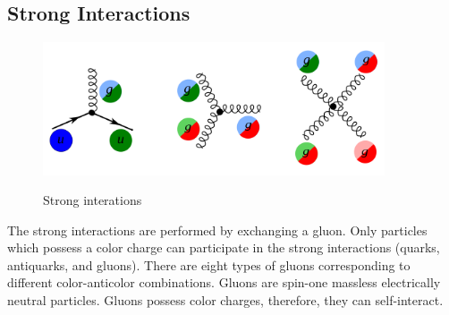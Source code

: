 \subsection{Strong Interactions}
\label{sec:Intro_QCD}

\begin{figure}[htb]
  \begin{center}
    {\includegraphics[width=0.90\textwidth]{../figs/Intro/feynmStrong.png}}
    \caption{Strong interations}
    \label{fig:feynmStrong}
  \end{center}
\end{figure}


The strong interactions are performed by exchanging a gluon. Only particles which possess a color charge can participate in the strong interactions (quarks, antiquarks, and gluons). There are eight types of gluons corresponding to different color-anticolor combinations. Gluons are spin-one massless electrically neutral particles. Gluons possess color charges, therefore, they can self-interact. 

